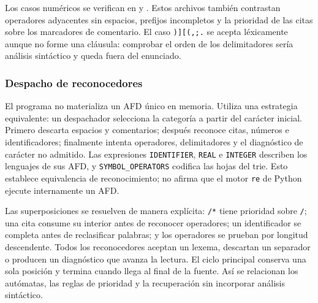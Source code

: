 Los casos numéricos se verifican en  y . Estos archivos también contrastan operadores adyacentes sin espacios, prefijos incompletos y la prioridad de las citas sobre los marcadores de comentario. El caso \texttt{)][(,;.} se acepta léxicamente aunque no forme una cláusula: comprobar el orden de los delimitadores sería análisis sintáctico y queda fuera del enunciado.

\subsubsection{Despacho de reconocedores}

El programa no materializa un AFD único en memoria. Utiliza una estrategia equivalente: un despachador selecciona la categoría a partir del carácter inicial. Primero descarta espacios y comentarios; después reconoce citas, números e identificadores; finalmente intenta operadores, delimitadores y el diagnóstico de carácter no admitido. Las expresiones \texttt{IDENTIFIER}, \texttt{REAL} e \texttt{INTEGER} describen los lenguajes de sus AFD, y \texttt{SYMBOL\_OPERATORS} codifica las hojas del trie. Esto establece equivalencia de reconocimiento; no afirma que el motor \texttt{re} de Python ejecute internamente un AFD.

Las superposiciones se resuelven de manera explícita: \texttt{/*} tiene prioridad sobre \texttt{/}; una cita consume su interior antes de reconocer operadores; un identificador se completa antes de reclasificar palabras; y los operadores se prueban por longitud descendente. Todos los reconocedores aceptan un lexema, descartan un separador o producen un diagnóstico que avanza la lectura. El ciclo principal conserva una sola posición y termina cuando llega al final de la fuente. Así se relacionan los autómatas, las reglas de prioridad y la recuperación sin incorporar análisis sintáctico.
